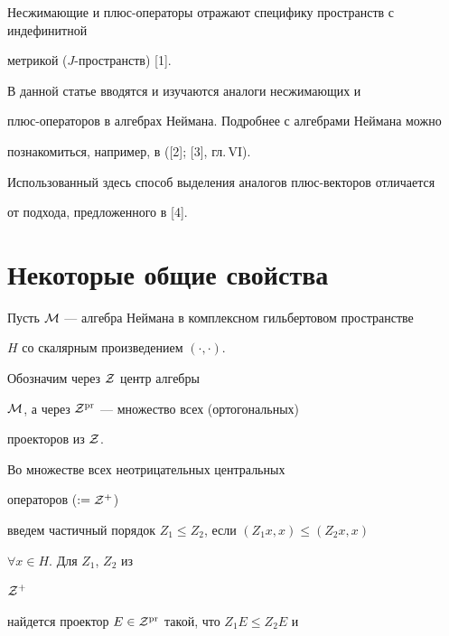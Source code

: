 \maketitle


\label{begin}











Несжимающие и плюс-операторы отражают специфику пространств с индефинитной


метрикой ($J$-пространств) [1].


В данной статье вводятся и изучаются аналоги несжимающих и


плюс-операторов в алгебрах Неймана.  Подробнее с алгебрами Неймана можно


познакомиться, например, в ([2]; [3], гл.\,VI).


Использованный здесь способ выделения аналогов плюс-векторов отличается 


от подхода, предложенного в [4].








\section*{Некоторые общие свойства}





Пусть $\cal M$ --- алгебра Неймана в комплексном гильбертовом пространстве


$H$ со скалярным произведением $(\cdot,\cdot)$.


Обозначим через ${\cal Z}$ центр алгебры


$\cal M$, а через ${\cal Z}^{\operatorname{pr}}$ --- множество всех (ортогональных)


проекторов из ${\cal Z}$. 


Во множестве всех неотрицательных центральных


операторов ($:={\cal Z}^{+}$) 


введем частичный порядок $Z_{1}\leq Z_{2}$, если $(Z_{1}x,x)\leq (Z_{2}x,x)$


$\forall x\in H$. Для $Z_{1}$, $Z_{2}$ из


${\cal Z}^{+}$ 


найдется проектор $E\in {\cal Z}^{\operatorname{pr}}$ такой, что $Z_{1}E\leq Z_{2}E$ и


